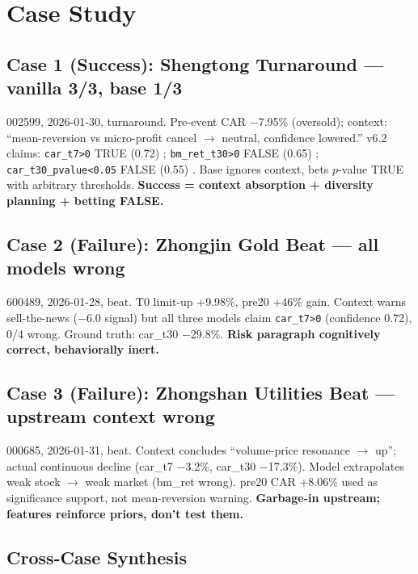 \documentclass[sigconf, anonymous, review]{acmart}
\begin{document}
\section{Case Study}

\subsection{Case 1 (Success): Shengtong Turnaround --- vanilla 3/3, base 1/3}

002599, 2026-01-30, turnaround. Pre-event CAR $-$7.95\% (oversold); context: ``mean-reversion vs micro-profit cancel $\to$ neutral, confidence lowered.'' v6.2 claims: \texttt{car\_t7>0} TRUE (0.72) \checkmark; \texttt{bm\_ret\_t30>0} FALSE (0.65) \checkmark; \texttt{car\_t30\_pvalue<0.05} FALSE (0.55) \checkmark. Base ignores context, bets $p$-value TRUE with arbitrary thresholds. \textbf{Success = context absorption + diversity planning + betting FALSE.}

\subsection{Case 2 (Failure): Zhongjin Gold Beat --- all models wrong}

600489, 2026-01-28, beat. T0 limit-up +9.98\%, pre20 +46\% gain. Context warns sell-the-news ($-$6.0 signal) but all three models claim \texttt{car\_t7>0} (confidence 0.72), 0/4 wrong. Ground truth: car\_t30 $-$29.8\%. \textbf{Risk paragraph cognitively correct, behaviorally inert.}

\subsection{Case 3 (Failure): Zhongshan Utilities Beat --- upstream context wrong}

000685, 2026-01-31, beat. Context concludes ``volume-price resonance $\to$ up''; actual continuous decline (car\_t7 $-$3.2\%, car\_t30 $-$17.3\%). Model extrapolates weak stock $\to$ weak market (bm\_ret wrong). pre20 CAR +8.06\% used as significance support, not mean-reversion warning. \textbf{Garbage-in upstream; features reinforce priors, don't test them.}

\subsection{Cross-Case Synthesis}
\end{document}
